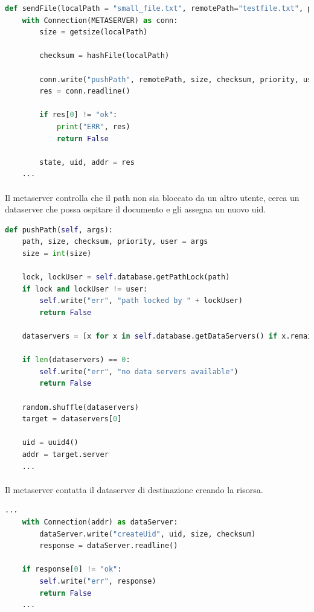 \documentclass[11pt,a4paper,english]{article}
\begin{document}
\begin{lstlisting}[language=Python, title=Client]
def sendFile(localPath = "small_file.txt", remotePath="testfile.txt", priority=1, user="default"):
    with Connection(METASERVER) as conn:
        size = getsize(localPath)
       
        checksum = hashFile(localPath)

        conn.write("pushPath", remotePath, size, checksum, priority, user)
        res = conn.readline()

        if res[0] != "ok":
            print("ERR", res)
            return False

        state, uid, addr = res
    ...
\end{lstlisting}

\paragraph{} Il metaserver controlla che il path non sia bloccato da un altro utente, cerca un dataserver che possa ospitare il documento e gli assegna un nuovo uid.

\begin{lstlisting}[language=Python, title=Metaserver]
def pushPath(self, args):
    path, size, checksum, priority, user = args
    size = int(size)

    lock, lockUser = self.database.getPathLock(path)
    if lock and lockUser != user:
        self.write("err", "path locked by " + lockUser)
        return False

    dataservers = [x for x in self.database.getDataServers() if x.remaining_capacity > size]

    if len(dataservers) == 0:
        self.write("err", "no data servers available")
        return False

    random.shuffle(dataservers)
    target = dataservers[0]

    uid = uuid4()
    addr = target.server
    ...
\end{lstlisting}

\paragraph{} Il metaserver contatta il dataserver di destinazione creando la risorsa.

\begin{lstlisting}[language=Python, title=Metaserver]
    ...
    with Connection(addr) as dataServer:
        dataServer.write("createUid", uid, size, checksum)
        response = dataServer.readline()

    if response[0] != "ok":
        self.write("err", response)
        return False
    ...
\end{lstlisting}
\end{document}
